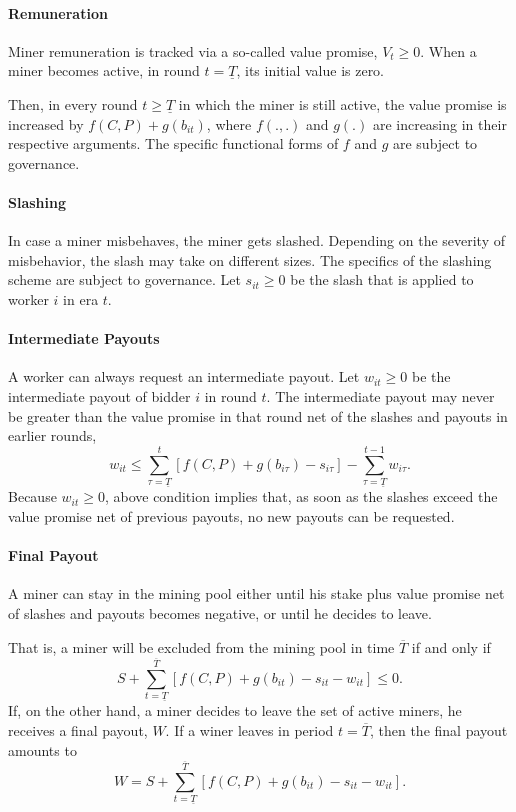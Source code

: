 \documentclass[11pt, a4paper, twocolumn]{article}
\begin{document}
\paragraph{Remuneration} Miner remuneration is tracked via a so-called value promise, $V_t \geq 0$. When a miner becomes active, in round $t = \underline T$, its initial value is zero.

Then, in every round $t \geq \underline T$ in which the miner is still active, the value promise is increased by $f(C,P)+g(b_{it})$, where $f(.,.)$ and $g(.)$ are increasing in their respective arguments. The specific functional forms of $f$ and $g$ are subject to governance.

\paragraph{Slashing} In case a miner misbehaves, the miner gets slashed. Depending on the severity of misbehavior, the slash may take on different sizes. The specifics of the slashing scheme are subject to governance. Let $s_{it} \geq 0$ be the slash that is applied to worker $i$ in era $t$.

\paragraph{Intermediate Payouts} A worker can always request an intermediate payout. Let $w_{it} \geq 0$ be the intermediate payout of bidder $i$ in round $t$. The intermediate payout may never be greater than the value promise in that round net of the slashes and payouts in earlier rounds, $$w_{it} \leq \sum_{\tau =\underline T}^t \left[f(C,P)+g(b_{i\tau}) - s_{i\tau}\right] - \sum_{\tau =\underline T}^{t-1} w_{i\tau}.$$ Because $w_{it} \geq 0$, above condition implies that, as soon as the slashes exceed the value promise net of previous payouts, no new payouts can be requested.

\paragraph{Final Payout} A miner can stay in the mining pool either until his stake plus value promise net of slashes and payouts becomes negative, or until he decides to leave. 

That is, a miner will be excluded from the mining pool in time $\overline T$ if and only if
%
$$S + \sum_{t=\underline T}^{\overline T}\left[ f(C,P)+g(b_{it}) - s_{it}-w_{it}\right] \leq 0.$$
%
If, on the other hand, a miner decides to leave the set of active miners, he receives a final payout, $W$. If a winer leaves in period $t=\overline T$, then the final payout amounts to 
%
$$W = S + \sum_{t=\underline T}^{\overline T}\left[ f(C,P)+g(b_{it}) - s_{it}-w_{it}\right].$$
\end{document}
